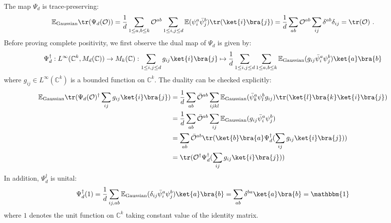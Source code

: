 \documentclass[a4paper,11pt]{article}
\theoremstyle{definition}
\numberwithin{equation}{section}
\begin{document}
The map $\Psi_d$ is trace-preserving:
\begin{align}
    \begin{split}
        \mathbb{E}_\text{Gaussian}\tr(\Psi_d(\mathcal{O})) = \frac{1}{d}\sum_{1\leq a,b\leq k}\mathcal{O}^{ab}\sum_{1\leq i,j\leq d}\mathbb{E}(\psi^a_i\bar{\psi}^b_j)\tr(\ket{i}\bra{j}) = \frac{1}{d}\sum_{ab}\mathcal{O}^{ab}\sum_{ij}\delta^{ab}\delta_{ij} = \tr(\mathcal{O})\ .
    \end{split}
\end{align}
Before proving complete positivity, we first observe the dual map of $\Psi_d$ is given by:
\begin{equation}
    \Psi_d^\dagger: L^\infty(\mathbb{C}^k, M_d(\mathbb{C}))\rightarrow M_k(\mathbb{C}): \sum_{1\leq i,j\leq d}g_{ij}\ket{i}\bra{j}\mapsto\frac{1}{d}\sum_{1\leq i,j\leq d}\sum_{1\leq a,b\leq k}\mathbb{E}_\text{Gaussian}(g_{ij}\bar{\psi}^a_i\psi^b_j)\ket{a}\bra{b}
\end{equation}
where $g_{ij} \in L^\infty(\mathbb{C}^k)$ is a bounded function on $\mathbb{C}^k$. The duality can be checked explicitly:
\begin{align}
    \begin{split}
        \mathbb{E}_\text{Gaussian}\tr(\Psi_d(\mathcal{O})^\dagger\sum_{ij}g_{ij}\ket{i}\bra{j}) &= \frac{1}{d}\sum_{ab}\bar{\mathcal{O}}^{ab}\sum_{ijkl}\mathbb{E}_\text{Gaussian}(\bar{\psi}^a_k\psi^b_lg_{ij})\tr(\ket{l}\bra{k}\ket{i}\bra{j})
        \\
        &=\frac{1}{d}\sum_{ab}\bar{\mathcal{O}}^{ab}\sum_{ij}\mathbb{E}_\text{Gaussian}(g_{ij}\bar{\psi}^a_i\psi^b_j)
        \\
        &=\sum_{ab}\bar{\mathcal{O}}^{ab}\tr(\ket{b}\bra{a}\Psi^\dagger_d(\sum_{ij}g_{ij}\ket{i}\bra{j}))
        \\
        &=\tr(\mathcal{O}^\dagger\Psi^\dagger_d(\sum_{ij}g_{ij}\ket{i}\bra{j}))
    \end{split}
\end{align}
In addition, $\Psi^\dagger_d$ is unital:
\begin{equation}
    \Psi^\dagger_d(1) = \frac{1}{d}\sum_{ij,ab}\mathbb{E}_\text{Gaussian}(\delta_{ij}\bar{\psi}^a_i\psi^b_j)\ket{a}\bra{b} = \sum_{ab}\delta^{ba}\ket{a}\bra{b} = \mathbbm{1}
\end{equation}
where $1$ denotes the unit function on $\mathbb{C}^k$ taking constant value of the identity matrix.
\end{document}
